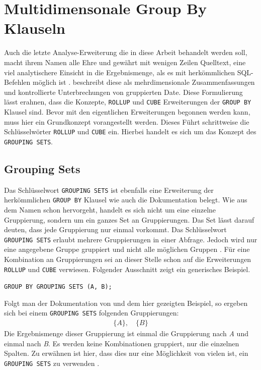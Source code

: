 
\section{Multidimensonale Group By Klauseln}
\label{sec:rollup_and_cube} Auch die letzte Analyse-Erweiterung die in diese
Arbeit behandelt werden soll, macht ihrem Namen alle Ehre und gewährt mit wenigen
Zeilen Quelltext, eine viel analytischere Einsicht in die Ergebnismenge, als es mit
herkömmlichen SQL-Befehlen möglich ist \citep[Kapitel 7.2.3]{melton2002advanced}.
\citet[Kapitel 7.2.3]{melton2002advanced} beschreibt diese als mehrdimensionale
Zusammenfassungen und kontrollierte Unterbrechungen von gruppierten Date. Diese Formulierung
lässt erahnen, dass die Konzepte, \texttt{ROLLUP} und \texttt{CUBE} Erweiterungen
der \texttt{GROUP BY} Klausel sind. Bevor mit den eigentlichen Erweiterungen begonnen
werden kann, muss hier ein Grundkonzept vorangestellt werden. Dieses Führt schrittweise
die Schlüsselwörter \texttt{ROLLUP} und \texttt{CUBE} ein. Hierbei handelt es
sich um das Konzept des \texttt{GROUPING SETS}.

\subsection{Grouping Sets}
\label{subsec:grouping_sets} Das Schlüsselwort \texttt{GROUPING SETS} ist
ebenfalls eine Erweiterung der herkömmlichen \texttt{GROUP BY} Klausel wie auch die
\citet{oracle16} Dokumentation belegt. Wie aus dem Namen schon hervorgeht,
handelt es sich nicht um eine einzelne Gruppierung, sondern um ein ganzes Set an
Gruppierungen. Das Set lässt darauf deuten, dass jede Gruppierung nur einmal vorkommt.
Das Schlüsselwort \texttt{GROUPING SETS} erlaubt mehrere Gruppierungen in einer Abfrage.
Jedoch wird nur eine angegebene Gruppe gruppiert und nicht alle möglichen
Gruppen \citet{oracle16}. Für eine Kombination an Gruppierungen sei an dieser
Stelle schon auf die Erweiterungen \texttt{ROLLUP} und \texttt{CUBE} verwiesen. Folgender
Ausschnitt zeigt ein generisches Beispiel.

\texttt{GROUP BY GROUPING SETS (A, B);}

Folgt man der Dokumentation von \citet{oracle16} und dem hier gezeigten Beispiel,
so ergeben sich bei einem \texttt{GROUPING SETS} folgenden Gruppierungen:
\begin{align*}
	\{A\}, \quad \{B\}
\end{align*}
Die Ergebnismenge dieser Gruppierung ist einmal die Gruppierung nach \textit{A}
und einmal nach \textit{B}. Es werden keine Kombinationen gruppiert, nur die einzelnen
Spalten. Zu erwähnen ist hier, dass dies nur eine Möglichkeit von vielen ist,
ein \texttt{GROUPING SETS} zu verwenden \citet{oracle16}.

